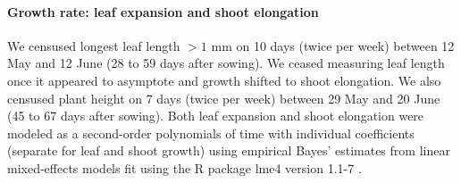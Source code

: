 \documentclass[11pt, oneside]{article}\usepackage[]{graphicx}\usepackage[]{color}
\newcommand{\pkg}[1]{{\fontseries{b}\selectfont #1}}
\begin{document}
\paragraph{Growth rate: leaf expansion and shoot elongation}

We censused longest leaf length $>1$ mm on 10 days (twice per week) between 12 May and 12 June (28 to 59 days after sowing). We ceased measuring leaf length once it appeared to asymptote and growth shifted to shoot elongation.  We also censused plant height on 7 days (twice per week) between 29 May and 20 June (45 to 67 days after sowing). Both leaf expansion and shoot elongation were modeled as a second-order polynomials of time with individual coefficients (separate for leaf and shoot growth) using empirical Bayes' estimates from linear mixed-effects models fit using the R package \pkg{lme4} version 1.1-7 \citep{Bates_etal_2014}.
\end{document}
